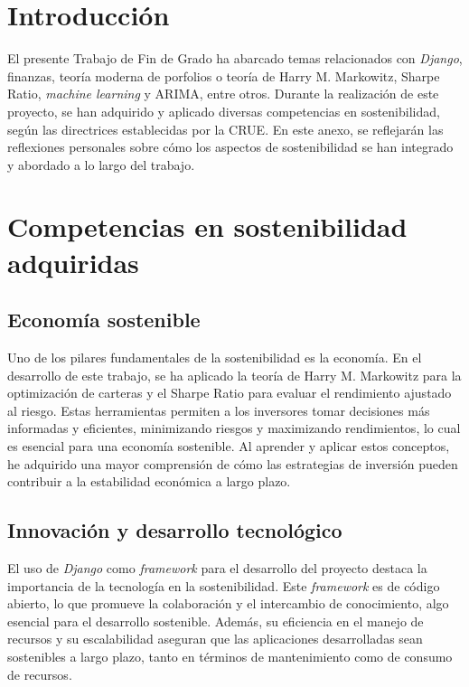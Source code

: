 
\section{Introducción}

El presente Trabajo de Fin de Grado ha abarcado temas relacionados con \emph{Django}, finanzas, teoría moderna de porfolios o teoría de Harry M. Markowitz, Sharpe Ratio, \emph{machine learning} y ARIMA, entre otros. Durante la realización de este proyecto, se han adquirido y aplicado diversas competencias en sostenibilidad, según las directrices establecidas por la CRUE\citep{online:crue}. En este anexo, se reflejarán las reflexiones personales sobre cómo los aspectos de sostenibilidad se han integrado y abordado a lo largo del trabajo.

\section{Competencias en sostenibilidad adquiridas}

\subsection{Economía sostenible}

Uno de los pilares fundamentales de la sostenibilidad es la economía. En el desarrollo de este trabajo, se ha aplicado la teoría de Harry M. Markowitz para la optimización de carteras y el Sharpe Ratio para evaluar el rendimiento ajustado al riesgo. Estas herramientas permiten a los inversores tomar decisiones más informadas y eficientes, minimizando riesgos y maximizando rendimientos, lo cual es esencial para una economía sostenible. Al aprender y aplicar estos conceptos, he adquirido una mayor comprensión de cómo las estrategias de inversión pueden contribuir a la estabilidad económica a largo plazo.

\subsection{Innovación y desarrollo tecnológico}

El uso de \emph{Django} como \emph{framework} para el desarrollo del proyecto destaca la importancia de la tecnología en la sostenibilidad. Este \emph{framework} es de código abierto, lo que promueve la colaboración y el intercambio de conocimiento, algo esencial para el desarrollo sostenible. Además, su eficiencia en el manejo de recursos y su escalabilidad aseguran que las aplicaciones desarrolladas sean sostenibles a largo plazo, tanto en términos de mantenimiento como de consumo de recursos.

